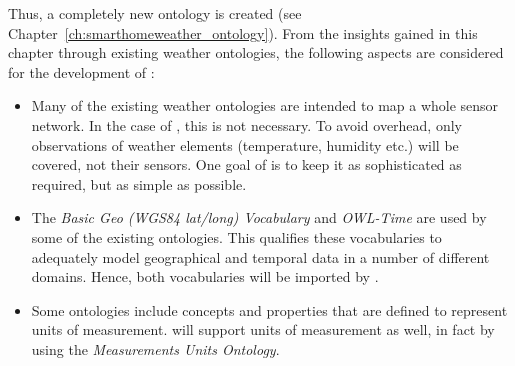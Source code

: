 Thus, a completely new ontology is created (see Chapter~\ref{ch:smarthomeweather_ontology}). From the insights gained in this chapter through existing weather ontologies, the following aspects are considered for the development of \smarthomeweather:

\begin{itemize}
  \item Many of the existing weather ontologies are intended to map a whole sensor network. In the case of \smarthomeweather, this is not necessary. To avoid overhead, only observations of weather elements (temperature, humidity etc.) will be covered, not their sensors. One goal of \smarthomeweather is to keep it as sophisticated as required, but as simple as possible.
  
  \item The \emph{Basic Geo (WGS84 lat/long) Vocabulary} and \emph{OWL-Time} are used by some of the existing ontologies. This qualifies these vocabularies to adequately model geographical and temporal data in a number of different domains. Hence, both vocabularies will be imported by \smarthomeweather.
  
  \item Some ontologies include concepts and properties that are defined to represent units of measurement. \smarthomeweather will support units of measurement as well, in fact by using the \emph{Measurements Units Ontology}.
\end{itemize}

